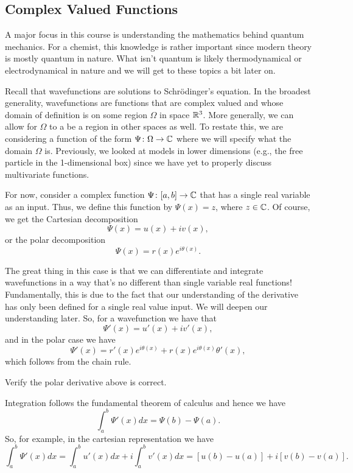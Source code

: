 \subsection{Complex Valued Functions}

A major focus in this course is understanding the mathematics behind quantum mechanics.  For a chemist, this knowledge is rather important since modern theory is mostly quantum in nature.  What isn't quantum is likely thermodynamical or electrodynamical in nature and we will get to these topics a bit later on. 

Recall that wavefunctions are solutions to Schr\"odinger's equation.  In the broadest generality, wavefunctions are functions that are complex valued and whose domain of definition is on some region $\Omega$ in space $\mathbb{R}^3$.  More generally, we can allow for $\Omega$ to a be a region in other spaces as well. To restate this, we are considering a function of the form $\Psi\colon \Omega \to \mathbb{C}$ where we will specify what the domain $\Omega$ is. Previously, we looked at models in lower dimensions (e.g., the free particle in the 1-dimensional box) since we have yet to properly discuss multivariate functions.  

For now, consider a complex function $\Psi\colon [a,b] \to \mathbb{C}$ that has a single real variable as an input.  Thus, we define this function by $\Psi(x)=z$, where $z\in \mathbb{C}$.  Of course, we get the Cartesian decomposition
\[
\Psi(x)=u(x)+iv(x),
\]
or the polar decomposition
\[
\Psi(x)=r(x)e^{i\theta(x)}.
\]

The great thing in this case is that we can differentiate and integrate wavefunctions in a way that's no different than single variable real functions!  Fundamentally, this is due to the fact that our understanding of the derivative has only been defined for a single real value input. We will deepen our understanding later.  So, for a wavefunction we have that
\[
\Psi'(x)=u'(x)+iv'(x),
\]
and in the polar case we have
\[
\Psi'(x)=r'(x)e^{i\theta(x)}+r(x)e^{i\theta(x)}\theta'(x),
\]
which follows from the chain rule.

\begin{exercise}
	Verify the polar derivative above is correct.
\end{exercise}

Integration follows the fundamental theorem of calculus and hence we have
\[
\int_a^b \Psi'(x)dx = \Psi(b)-\Psi(a).
\]
So, for example, in the cartesian representation we have
\[
\int_a^b \Psi'(x)dx = \int_a^b u'(x)dx+i\int_a^b v'(x)dx = [u(b)-u(a)]+i[v(b)-v(a)].
\]

